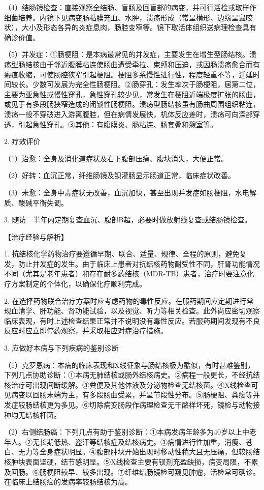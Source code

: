 （4）结肠镜检查：直接观察全结肠、盲肠及回盲部的病变，并可行活检或取样作细菌培养。内镜下见病变肠粘膜充血、水肿，溃疡形成（常呈横形、边缘呈鼠咬状），大小及形态各异的炎症息肉，肠腔变窄等。镜下取活体组织送病理检查具有确诊价值。

（5）并发症：①肠梗阻：是本病最常见的并发症，主要发生在增生型肠结核。溃疡型肠结核由于邻近腹膜粘连使肠曲遭受牵拉、束缚和压迫，或因肠溃疡愈合而有瘢痕收缩，可使肠腔狭窄引起梗阻。梗阻多系慢性进行性，程度轻重不等，迁延时间较长。少数可发展为完全性肠梗阻。②肠穿孔：发生率次于肠梗阻，居第二位，主要为亚急性或慢性穿孔，急性穿孔较少见，常发生在梗阻近端极度扩张的肠曲，或见于有多段肠狭窄造成的闭锁性肠梗阻。溃疡型肠结核虽有肠曲周围组织粘连，溃疡一般不穿破进入游离腹腔，但在病情发展快，机体反应差时，溃疡可向深部穿透，引起急性穿孔。③其他：有腹膜炎、肠粘连、肠套叠和憩室等。

2. 疗效评价

（1）治愈：全身及消化道症状及右下腹部压痛、腹块消失，大便正常。

（2）好转：血沉正常，纤维肠镜及钡灌肠显示肠道正常，临床症状改善。

（3）未愈：全身中毒症状无改善，血沉加快，甚至出现并发症如肠梗阻，水电解质、酸碱平衡失调。

3. 随访　半年内定期复查血沉、腹部B超，必要时做放射线复查或结肠镜检查。

【治疗经验与解析】

1.
抗结核化学药物治疗要遵循早期、联合、适量、规律、全程的原则，避免复发，防止并发症的发生。由于临床上患者对抗结核药物耐受性不同，肝肾功能情况不同（尤其是老年患者）和存在耐多药结核（MDR-TB）患者，治疗时要注意化疗方案制定的个体化，以确保化疗顺利完成。

2.
在选择药物联合治疗方案时应考虑药物的毒性反应。在服药期间应定期进行常规血清学、肝功能、肾功能试验，以及视觉、听力等相关检查。此外尚应密切观察临床表现，有时上述检查结果正常并不说明没有毒性反应。若服药期间发现有不良反应时应立即停药观察，并采取相应对症治疗措施。

3. 应做好本病与下列疾病的鉴别诊断

（1）克罗恩病：本病的临床表现和X线征象与肠结核极为酷似，有时甚难鉴别，下列几点协助诊断：①本病无肺结核或肠外结核病史。②病程一般更长，不经抗结核治疗可出现间断缓解。③粪便及其他体液及分泌物检查无结核菌。④X线检查可见病变以回肠末端为主，有多段肠曲受累，并呈节段性分布。⑤肠梗阻、粪瘘等并发症较肠结核更为多见。⑥切除病变肠段作病理检查无干酪样坏死，镜检与动物接种均无结核杆菌。

（2）右侧结肠癌：下列几点有助于鉴别诊断：①本病发病年龄多为40岁以上中老年人。②无长期低热、盗汗等结核症及结核病史。③病情进行性加重，消瘦、苍白、无力等全身症状明显。④腹部肿块开始出现时移动性稍大且无压痛，但较肠结核肿块表面坚硬，结节感明显。⑤X线检查主要有钡剂充盈缺损，病变局限，不累及回肠。⑥肠梗阻较早、较多出现。⑦纤维结肠镜检可窥见肿瘤，活检常可确诊。在临床上结肠癌的发病率较肠结核为高。

